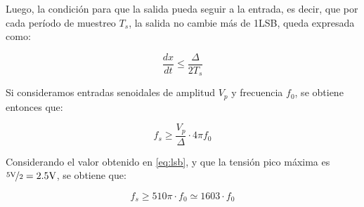 \documentclass[assd_tp3_main.tex]{subfiles}
\begin{document}
Luego, la condici\'on para que la salida pueda seguir a la entrada, es decir, que por cada per\'iodo de muestreo $T_s$, la salida no cambie m\'as de 1LSB, queda expresada como:

\[ 
	\frac{dx}{dt} \leq \frac{\Delta}{2T_s}
\]

Si consideramos entradas senoidales de amplitud $V_p$ y frecuencia $f_0$, se obtiene entonces que:

\begin{equation}
	f_s \geq \frac{V_p}{\Delta} \cdot 4\pi f_0
\end{equation}

Considerando el valor obtenido en \ref{eq:lsb}, y que la tensi\'on pico m\'axima es $\nicefrac{5\mathrm{V}}{2} = 2.5\mathrm{V}$, se obtiene que:

\begin{equation}
	f_s \geq 510 \pi \cdot f_0 \simeq 1603 \cdot f_0
\end{equation}
\end{document}
